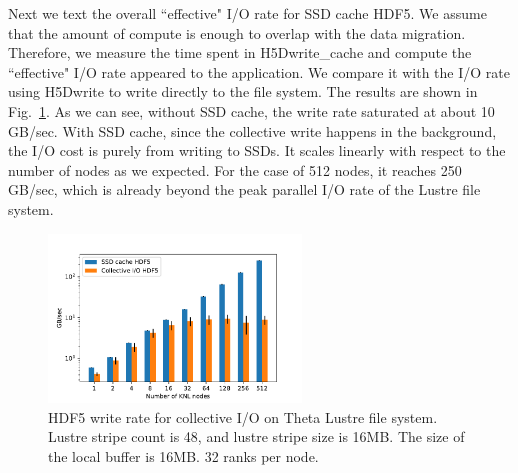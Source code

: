 \documentclass[aps, rmp, 11pt, notitlepage]{revtex4-1}
\begin{document}
Next we text the overall ``effective" I/O rate for SSD cache HDF5. We assume that the amount of compute is enough to overlap with the data migration. Therefore, we measure the time spent in H5Dwrite\_cache and compute the ``effective" I/O rate appeared to the application. We compare it with the I/O rate using H5Dwrite to write directly to the file system. The results are shown in Fig.~\ref{fig:perf}.
 As we can see, without SSD cache, the write rate saturated at about 10 GB/sec. With SSD cache, since the collective write happens in the background, the I/O cost is purely from writing to SSDs. It scales linearly with respect to the number of nodes as we expected. For the case of 512 nodes, it reaches 250 GB/sec, which is already beyond the peak parallel I/O rate of the Lustre file system. 
\label{sec:perf}
\begin{figure}[hbt]
\centering
\includegraphics[width=0.6\textwidth]{ssd_cache.pdf}
\caption{HDF5 write rate for collective I/O on Theta Lustre file system. Lustre stripe count is 48, and lustre stripe size is 16MB. The size of the local buffer is 16MB. 32 ranks per node.}\label{fig:perf}
\end{figure}
\end{document}
